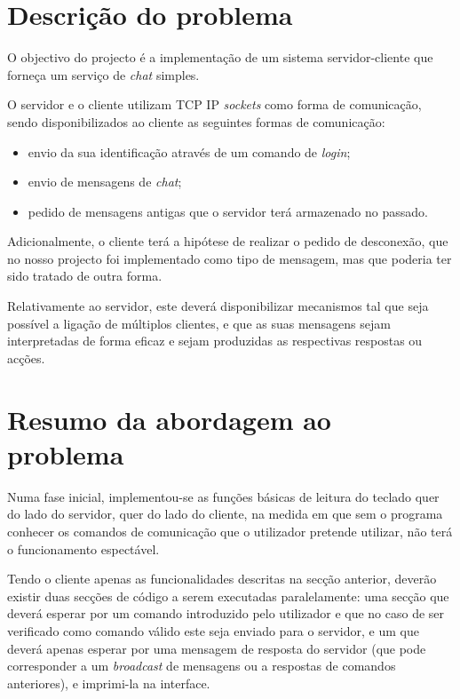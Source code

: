 \documentclass[a4paper]{article}
\begin{document}


\tableofcontents
{}
\pagebreak

\section{Descrição do problema}

O objectivo do projecto é a implementação de um sistema servidor-cliente que forneça um serviço de \textit{chat} simples.

O servidor e o cliente utilizam TCP IP \textit{sockets} como forma de comunicação, sendo disponibilizados ao cliente as seguintes formas de comunicação:

\begin{itemize}
  \item envio da sua identificação através de um comando de \textit{login};
  \item envio de mensagens de \textit{chat};
  \item pedido de mensagens antigas que o servidor terá armazenado no passado.
\end{itemize}

Adicionalmente, o cliente terá a hipótese de realizar o pedido de desconexão, que no nosso projecto foi implementado como tipo de mensagem, mas que poderia ter sido tratado de outra forma.

Relativamente ao servidor, este deverá disponibilizar mecanismos tal que seja possível a ligação de múltiplos clientes, e que as suas mensagens sejam interpretadas de forma eficaz e sejam produzidas as respectivas respostas ou acções.

\section{Resumo da abordagem ao problema}

Numa fase inicial, implementou-se as funções básicas de leitura do teclado quer do lado do servidor, quer do lado do cliente, na medida em que sem o programa conhecer os comandos de comunicação que o utilizador pretende utilizar, não terá o funcionamento espectável.


Tendo o cliente apenas as funcionalidades descritas na secção anterior, deverão existir duas secções de código a serem executadas paralelamente: uma secção que deverá esperar por um comando introduzido pelo utilizador e que no caso de ser verificado como comando válido este seja enviado para o servidor, e um que deverá apenas esperar por uma mensagem de resposta do servidor (que pode corresponder a um \textit{broadcast} de mensagens ou a respostas de comandos anteriores), e imprimi-la na interface.
\end{document}
